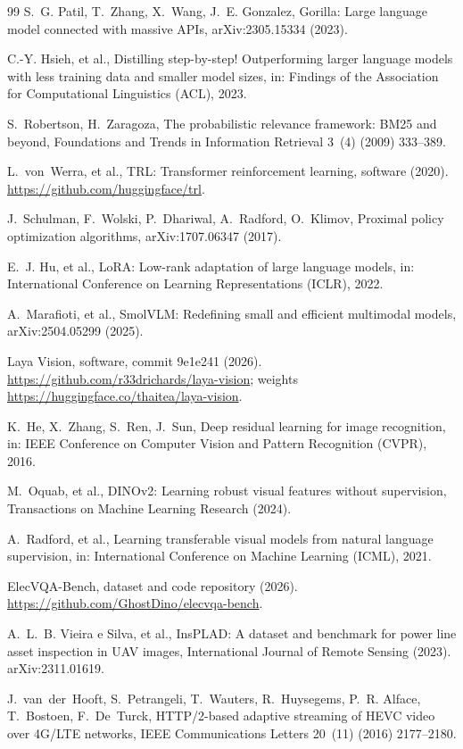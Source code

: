 \documentclass[final,5p,times,twocolumn]{elsarticle}
\begin{document}
\begin{thebibliography}{99}
 S.~G. Patil, T.~Zhang, X.~Wang, J.~E. Gonzalez, Gorilla: Large language model connected with massive APIs, arXiv:2305.15334 (2023).

 C.-Y. Hsieh, et al., Distilling step-by-step! Outperforming larger language models with less training data and smaller model sizes, in: Findings of the Association for Computational Linguistics (ACL), 2023.

 S.~Robertson, H.~Zaragoza, The probabilistic relevance framework: BM25 and beyond, Foundations and Trends in Information Retrieval 3~(4) (2009) 333--389.

 L.~von~Werra, et al., TRL: Transformer reinforcement learning, software (2020). \url{https://github.com/huggingface/trl}.

 J.~Schulman, F.~Wolski, P.~Dhariwal, A.~Radford, O.~Klimov, Proximal policy optimization algorithms, arXiv:1707.06347 (2017).

 E.~J. Hu, et al., LoRA: Low-rank adaptation of large language models, in: International Conference on Learning Representations (ICLR), 2022.

 A.~Marafioti, et al., SmolVLM: Redefining small and efficient multimodal models, arXiv:2504.05299 (2025).

 Laya Vision, software, commit 9e1e241 (2026). \url{https://github.com/r33drichards/laya-vision}; weights \url{https://huggingface.co/thaitea/laya-vision}.

 K.~He, X.~Zhang, S.~Ren, J.~Sun, Deep residual learning for image recognition, in: IEEE Conference on Computer Vision and Pattern Recognition (CVPR), 2016.

 M.~Oquab, et al., DINOv2: Learning robust visual features without supervision, Transactions on Machine Learning Research (2024).

 A.~Radford, et al., Learning transferable visual models from natural language supervision, in: International Conference on Machine Learning (ICML), 2021.

 ElecVQA-Bench, dataset and code repository (2026). \url{https://github.com/GhostDino/elecvqa-bench}.

 A.~L.~B. Vieira e Silva, et al., InsPLAD: A dataset and benchmark for power line asset inspection in UAV images, International Journal of Remote Sensing (2023). arXiv:2311.01619.

 J.~van~der~Hooft, S.~Petrangeli, T.~Wauters, R.~Huysegems, P.~R. Alface, T.~Bostoen, F.~De~Turck, HTTP/2-based adaptive streaming of HEVC video over 4G/LTE networks, IEEE Communications Letters 20~(11) (2016) 2177--2180.

\end{thebibliography}
\end{document}
